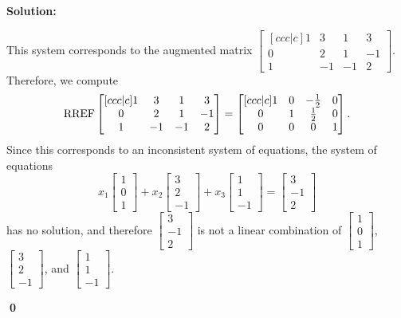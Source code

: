 \documentclass{article}
\newenvironment{solution}
{
  \ignorespaces
  \textbf{Solution:}
}
{
  \ignorespacesafterend
  \begin{flushright}
  {\bfseries \qed}
  \end{flushright}
}
\begin{document}
\begin{solution}
This system corresponds to the augmented matrix 
  \(\begin{bmatrix}[ccc|c]
  1 & 3 & 1 & 3 \\
  0 & 2 & 1 & -1 \\
  1 & -1 & -1 & 2
  \end{bmatrix}\).  Therefore, we compute
\[ \operatorname{RREF}
  \begin{bmatrix}[ccc|c]
  1 & 3 & 1 & 3 \\
  0 & 2 & 1 & -1 \\
  1 & -1 & -1 & 2
  \end{bmatrix}
  =
  \begin{bmatrix}[ccc|c]
  1 & 0 & -\frac{1}{2} & 0 \\
  0 & 1 & \frac{1}{2} & 0 \\
  0 & 0 & 0 & 1
  \end{bmatrix}.
\]
Since this corresponds to an inconsistent system of equations, the system of equations
\[
x_1\begin{bmatrix} 1 \\ 0 \\ 1 \end{bmatrix} +
x_2\begin{bmatrix} 3 \\ 2 \\ -1 \end{bmatrix} +
x_3\begin{bmatrix} 1 \\ 1 \\ -1 \end{bmatrix} =
\begin{bmatrix} 3 \\ -1 \\ 2 \end{bmatrix} \]
has no solution, and therefore 
\(\begin{bmatrix} 3 \\ -1 \\ 2 \end{bmatrix} \) is 
not a linear combination of \(\begin{bmatrix} 1 \\ 0 \\ 1 \end{bmatrix} \),
\(\begin{bmatrix} 3 \\ 2 \\ -1 \end{bmatrix} \), and
\(\begin{bmatrix} 1 \\ 1 \\ -1 \end{bmatrix} \).

\end{solution}
\end{document}
